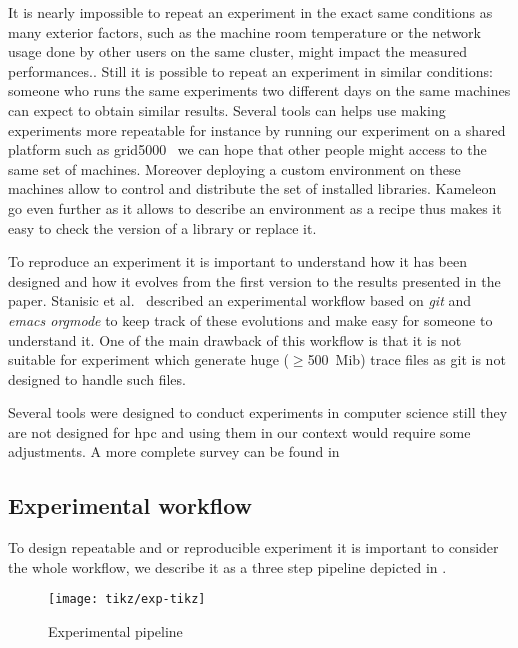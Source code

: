 It is nearly impossible to repeat an experiment in the exact same conditions
as many exterior factors, such as the machine room temperature or the network
usage done by other users on the same cluster, might impact the measured
performances..
Still it is possible to repeat an experiment in similar conditions: someone
who runs the same experiments two different days on the same machines can
expect to obtain similar results. Several tools can helps use making
experiments more repeatable for instance by running our experiment on a shared
platform such as grid5000~\cite{Cappello05Grid5000} we can hope that other
people might access to the same set of machines. Moreover deploying a custom
environment on these machines allow to control and distribute the set of
installed libraries. Kameleon~\cite{Ruiz15Reconstructable} go even
further as it allows to describe an environment as a recipe thus makes it easy
to check the version of a library or replace it.

To reproduce an experiment it is important to understand how it has been
designed and how it evolves from the first version to the results presented in
the paper. Stanisic et al.~\cite[Chapter~4, p31-44]{Stanisic15Reproducible}
described an experimental workflow based on \emph{git} and \emph{emacs orgmode}
to keep track of these evolutions and make easy for someone to understand it.
One of the main drawback of this workflow is that it is not suitable for
experiment which generate huge ($\ge$\SI{500}{Mib}) trace files as git is not
designed to handle such files.

Several tools were designed to conduct experiments in computer science still
they are not designed for \gls{hpc} and using them in our context would
require some adjustments. A more complete survey can be found
in~\cite[Chapter~3, p17-19]{Stanisic15Reproducible}

\subsection{Experimental workflow}

To design repeatable and or reproducible experiment it is important to
consider the whole workflow, we describe it as a three step pipeline depicted
in .

\begin{figure}[htb]
    \centering
    \texttt{[image: tikz/exp-tikz]}
    \caption{Experimental pipeline}
    \label{fig:exp-pipe}
\end{figure}

